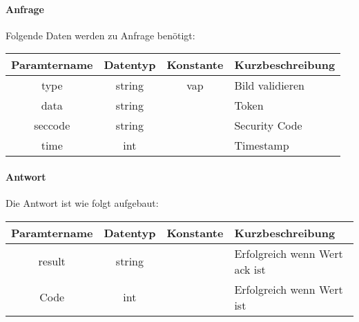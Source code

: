 \paragraph{Anfrage}Folgende Daten werden zu Anfrage benötigt:
\begin{table}[H]
	\begin{tabular}{|c|c|c|p{6.5cm}|}
		\hline
		\textbf{Paramtername} & \textbf{Datentyp} & \textbf{Konstante} & \textbf{Kurzbeschreibung}                                                                                               \\ \hline
		type                & string            & vap                & Bild validieren \\ \hline
		data                & string            &                    & Token \\ \hline
		seccode             & string            &                    & Security Code \\ \hline
		time                & int               &                    & Timestamp \\ \hline
	\end{tabular}
\end{table}
\paragraph{Antwort}Die Antwort ist wie folgt aufgebaut:
\begin{table}[H]
	\begin{tabular}{|c|c|c|p{6.5cm}|}
		\hline
		\textbf{Paramtername} & \textbf{Datentyp} & \textbf{Konstante} & \textbf{Kurzbeschreibung}            \\ \hline                
		result              & string           &                 & Erfolgreich wenn Wert {\glqq ack\grqq} ist \\ \hline
		Code                & int              &                 & Erfolgreich wenn Wert {\glqq 0\grqq} ist \\ \hline
	\end{tabular}
\end{table}